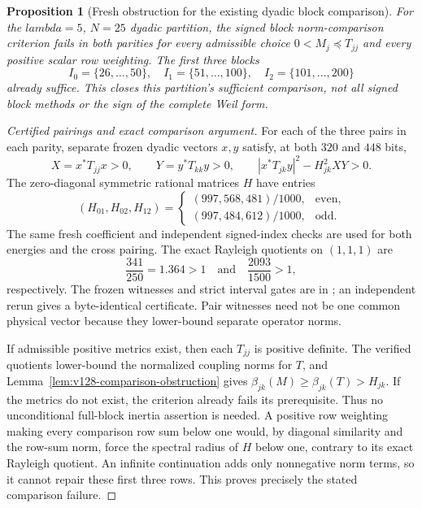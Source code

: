 \documentclass[11pt]{article}
\def\lambda{lambda}%
\newtheorem{proposition}[theorem]{Proposition}
\theoremstyle{remark}
\begin{document}
\begin{proposition}[Fresh obstruction for the existing dyadic block comparison]
\label{prop:v152-block-comparison}
For the $\lambda=5$, $N=25$ dyadic partition, the signed block
norm-comparison criterion fails in both parities for every admissible
choice $0<M_j\preceq T_{jj}$ and every positive scalar row weighting.
The first three blocks
\[
 I_0=\{26,\ldots,50\},\quad I_1=\{51,\ldots,100\},\quad
 I_2=\{101,\ldots,200\}
\]
already suffice. This closes this partition's sufficient comparison,
not all signed block methods or the sign of the complete Weil form.
\end{proposition}
\begin{proof}[Certified pairings and exact comparison argument]
For each of the three pairs in each parity, separate frozen dyadic
vectors $x,y$ satisfy, at both $320$ and $448$ bits,
\[
 X=x^*T_{jj}x>0,\qquad Y=y^*T_{kk}y>0,\qquad
 |x^*T_{jk}y|^2-H_{jk}^2XY>0.
\]
The zero-diagonal symmetric rational matrices $H$ have entries
\[
 (H_{01},H_{02},H_{12})=
 \begin{cases}(997,568,481)/1000,&\text{even},\\
              (997,484,612)/1000,&\text{odd}.
 \end{cases}
\]
The same fresh coefficient and independent signed-index checks are
used for both energies and the cross pairing. The exact Rayleigh
quotients on $(1,1,1)$ are
\[
 \frac{341}{250}=1.364>1\quad\text{and}\quad
 \frac{2093}{1500}>1,
\]
respectively. The frozen witnesses and strict interval gates are in
; an independent rerun gives a
byte-identical certificate. Pair witnesses need not be one common
physical vector because they lower-bound separate operator norms.

If admissible positive metrics exist, then each $T_{jj}$ is positive
definite. The verified quotients lower-bound the normalized coupling
norms for $T$, and Lemma~\ref{lem:v128-comparison-obstruction} gives
$\beta_{jk}(M)\ge\beta_{jk}(T)>H_{jk}$. If the metrics do not exist,
the criterion already fails its prerequisite. Thus no unconditional
full-block inertia assertion is needed. A positive row weighting making
every comparison row sum below one would, by diagonal similarity and
the row-sum norm, force the spectral radius of $H$ below one, contrary
to its exact Rayleigh quotient. An infinite continuation adds only
nonnegative norm terms, so it cannot repair these first three rows.
This proves precisely the stated comparison failure.
\end{proof}
\end{document}
